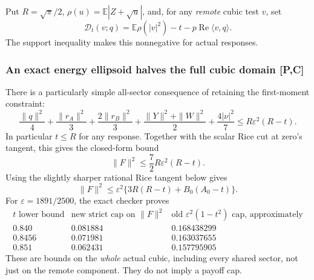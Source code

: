 Put $R=\sqrt\pi/2$, $\rho(u)=\mathbb E|Z+\sqrt u|$, and, for any
\emph{remote} cubic test $v$, set
\[
 \mathcal D_t(v;q)=\mathbb E\rho(|v|^2)-t-p\operatorname{Re}\langle v,q\rangle.
\]
The support inequality makes this nonnegative for actual responses.

\subsubsection{An exact energy ellipsoid halves the full cubic domain [P,C]}
There is a particularly simple all-sector consequence of retaining the
first-moment constraint:
\begin{equation}\label{eq:sector-ellipsoid}
 \boxed{\quad
 \frac{\|q\|^2}{4}+\frac{\|r_A\|^2}{3}
 +\frac{2\|r_B\|^2}{3}
 +\frac{\|Y\|^2+\|W\|^2}{2}+\frac{4|\nu|^2}{7}
 \le R\varepsilon^2(R-t).\quad}
\end{equation}
In particular $t\le R$ for any response. Together with the scalar
Rice cut at zero's tangent, this gives the closed-form bound
\begin{equation}\label{eq:sector-closed-total}
 \boxed{\quad \|F\|^2\le\frac72 R\varepsilon^2(R-t).\quad}
\end{equation}
Using the slightly sharper rational Rice tangent below gives
\begin{equation}\label{eq:sector-refined-total}
 \|F\|^2\le\varepsilon^2
   \{3R(R-t)+B_0(A_0-t)\}.
\end{equation}
For $\varepsilon=1891/2500$, the exact checker proves
\[
\begin{array}{c|c|c}
 t\text{ lower bound}&\text{new strict cap on }\|F\|^2
 &\text{old }\varepsilon^2(1-t^2)\text{ cap, approximately}\\\hline
 0.840&0.081884&0.168438299\\
 0.8456&0.071981&0.163037655\\
 0.851&0.062431&0.157795905
\end{array}
\]
These are bounds on the \emph{whole} actual cubic, including every shared
sector, not just on the remote component. They do not imply a payoff cap.

